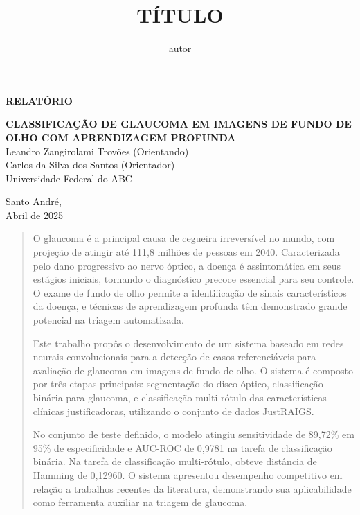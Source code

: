 \documentclass[12pt]{article}
\title{TÍTULO}
\author{autor}
\begin{document}
\thispagestyle{empty}
\begin{flushright}
    \begin{huge}
     \textbf{RELATÓRIO}\\[3,5cm]
    \end{huge}
    {\bf \LARGE  CLASSIFICAÇÃO DE GLAUCOMA EM IMAGENS DE FUNDO DE OLHO COM APRENDIZAGEM PROFUNDA}\\
    \bigskip 
    Leandro Zangirolami Trovões (Orientando)\\
    Carlos da Silva dos Santos (Orientador)\\
    Universidade Federal do ABC\\[5,5cm]
\end{flushright}
\vfill
\begin{center}
    Santo André,\\
    Abril de 2025
\end{center}
\newpage


\begin{center}
\end{center}

\begin{quote}
O glaucoma é a principal causa de cegueira irreversível no mundo, com projeção de atingir até 111,8 milhões de pessoas em 2040. Caracterizada pelo dano progressivo ao nervo óptico, a doença é assintomática em seus estágios iniciais, tornando o diagnóstico precoce essencial para seu controle. O exame de fundo de olho permite a identificação de sinais característicos da doença, e técnicas de aprendizagem profunda têm demonstrado grande potencial na triagem automatizada.

Este trabalho propôs o desenvolvimento de um sistema baseado em redes neurais convolucionais para a detecção de casos referenciáveis para avaliação de glaucoma em imagens de fundo de olho. O sistema é composto por três etapas principais: segmentação do disco óptico, classificação binária para glaucoma, e classificação multi-rótulo das características clínicas justificadoras, utilizando o conjunto de dados JustRAIGS.

No conjunto de teste definido, o modelo atingiu sensitividade de 89,72\% em 95\% de especificidade e AUC-ROC de 0,9781 na tarefa de classificação binária. Na tarefa de classificação multi-rótulo, obteve distância de Hamming de 0,12960. O sistema apresentou desempenho competitivo em relação a trabalhos recentes da literatura, demonstrando sua aplicabilidade como ferramenta auxiliar na triagem de glaucoma.
\end{quote}
\end{document}
